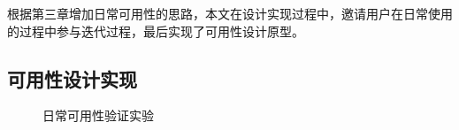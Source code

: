 根据第三章增加日常可用性的思路，本文在设计实现过程中，邀请用户在日常使用的过程中参与迭代过程，最后实现了可用性设计原型。

\subsection{可用性设计实现}

\begin{figure}[h]
    \centering
    \caption{日常可用性验证实验}
    \label{fig:interface}
\end{figure}


